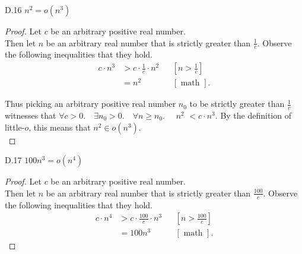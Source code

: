 \documentclass[10pt]{article}
\begin{document}
\begin{enumerate}[label={}]
          \newpage

          D.16 $n^2=o\left(n^3\right)$
          \begin{proof}
              Let $c$ be an arbitrary positive real number.\\
              Then let $n$ be an arbitrary real number that is strictly greater than $\frac{1}{c}$. Observe the following inequalities that they hold.\\
              $$
                  \begin{aligned}
                      c \cdot n^3 & >c \cdot \frac{1}{c} \cdot n^2 &  & {\left[n>\frac{1}{c}\right] } \\
                                  & =n^2                           &  & {[\text { math }]. }
                  \end{aligned}
              $$

              Thus picking an arbitrary positive real number $n_0$ to be strictly greater than $\frac{1}{c}$ witnesses that $\forall c>0 . \quad \exists n_0>0 . \quad \forall n \geq n_0 . \quad$ $n^2$ $< c \cdot n^3$. By the definition of little-$o$, this means that $n^2 \in o\left(n^3\right)$.\\
          \end{proof}
          D.17 $100 n^3=o\left(n^4\right)$
          \begin{proof}
              Let $c$ be an arbitrary positive real number.\\
              Then let $n$ be an arbitrary real number that is strictly greater than $\frac{100}{c}$. Observe the following inequalities that they hold.\\
              $$
                  \begin{aligned}
                      c \cdot n^4 & >c \cdot \frac{100}{c} \cdot n^3 &  & {\left[n>\frac{100}{c}\right] } \\
                                  & =100n^3                          &  & {[\text { math }]. }
                  \end{aligned}
              $$


\end{proof}
\end{enumerate}
\end{document}
